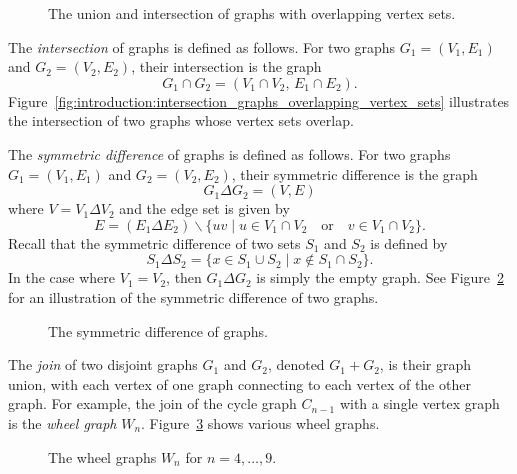 \begin{figure}[!htbp]
\centering

\caption{The union and intersection of graphs with overlapping vertex sets.}
\label{fig:introduction:union_intersection_graphs_overlapping_vertex_sets}
\end{figure}

The \emph{intersection} of graphs is defined as follows. For two
graphs $G_1 = (V_1, E_1)$ and $G_2 = (V_2, E_2)$, their intersection
is the graph
\[
G_1 \cap G_2
=
(V_1 \cap V_2,\, E_1 \cap E_2).
\]
Figure~\ref{fig:introduction:intersection_graphs_overlapping_vertex_sets}
illustrates the intersection of two graphs whose vertex sets overlap.

The \emph{symmetric difference} of graphs is defined as follows. For
two graphs $G_1 = (V_1, E_1)$ and $G_2 = (V_2, E_2)$, their symmetric
difference is the graph
\[
G_1 \Delta G_2
=
(V, E)
\]
where $V = V_1 \Delta V_2$ and the edge set is given by
\[
E
=
(E_1 \Delta E_2) \backslash
\{
uv \;|\; u \in V_1 \cap V_2 \quad\text{or}\quad v \in V_1 \cap V_2
\}.
\]
Recall that the symmetric difference of two sets $S_1$ and $S_2$ is
defined by
\[
S_1 \Delta S_2
=
\{x \in S_1 \cup S_2 \;|\; x \notin S_1 \cap S_2\}.
\]
In the case where $V_1 = V_2$, then $G_1 \Delta G_2$ is simply the
empty graph. See Figure~\ref{fig:introduction:symmetric_difference}
for an illustration of the symmetric difference of two graphs.
\index{$\Delta$}

\begin{figure}[!htbp]
\centering

\caption{The symmetric difference of graphs.}
\label{fig:introduction:symmetric_difference}
\end{figure}

The \emph{join} of two disjoint graphs $G_1$ and $G_2$, denoted
$G_1 + G_2$, is their graph union, with each vertex of one graph
connecting to each vertex of the other graph. For example, the join of
the cycle graph $C_{n-1}$ with a single vertex graph is the
\emph{wheel graph} $W_n$. Figure~\ref{fig:introduction:wheel_graphs}
shows various wheel graphs.

\begin{figure}[!htbp]
\centering

\caption{The wheel graphs $W_n$ for $n = 4,\dots,9$.}
\label{fig:introduction:wheel_graphs}
\end{figure}


